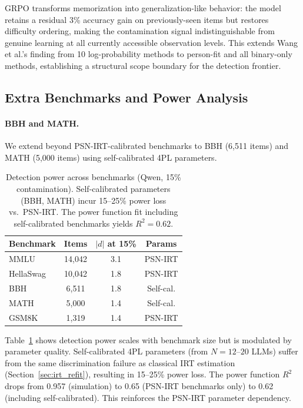 \documentclass[11pt,a4paper]{article}
\begin{document}
GRPO transforms memorization into generalization-like behavior: the model retains a residual 3\% accuracy gain on previously-seen items but restores difficulty ordering, making the contamination signal indistinguishable from genuine learning at all currently accessible observation levels. This extends Wang et al.'s finding from 10 log-probability methods to person-fit and all binary-only methods, establishing a structural scope boundary for the detection frontier.

\subsection{Extra Benchmarks and Power Analysis}\label{sec:extra}

\paragraph{BBH and MATH.} We extend beyond PSN-IRT-calibrated benchmarks to BBH (6,511 items) and MATH (5,000 items) using self-calibrated 4PL parameters.

\begin{table}[t]
\centering
\small
\begin{tabular}{lccc}
\toprule
\textbf{Benchmark} & \textbf{Items} & \textbf{$|d|$ at 15\%} & \textbf{Params} \\
\midrule
MMLU & 14,042 & 3.1 & PSN-IRT \\
HellaSwag & 10,042 & 1.8 & PSN-IRT \\
BBH & 6,511 & 1.8 & Self-cal. \\
MATH & 5,000 & 1.4 & Self-cal. \\
GSM8K & 1,319 & 1.4 & PSN-IRT \\
\bottomrule
\end{tabular}
\caption{Detection power across benchmarks (Qwen, 15\% contamination). Self-calibrated parameters (BBH, MATH) incur 15--25\% power loss vs.\ PSN-IRT. The power function fit including self-calibrated benchmarks yields $R^2 = 0.62$.}
\label{tab:extra_benchmarks}
\end{table}

Table~\ref{tab:extra_benchmarks} shows detection power scales with benchmark size but is modulated by parameter quality. Self-calibrated 4PL parameters (from $N = 12$--$20$ LLMs) suffer from the same discrimination failure as classical IRT estimation (Section~\ref{sec:irt_refit}), resulting in 15--25\% power loss. The power function $R^2$ drops from 0.957 (simulation) to 0.65 (PSN-IRT benchmarks only) to 0.62 (including self-calibrated). This reinforces the PSN-IRT parameter dependency.
\end{document}
